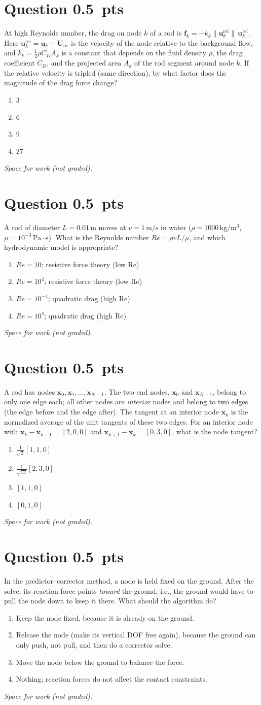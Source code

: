 \documentclass[letterpaper,11pt]{article}
\newcounter{qnum}
\newcommand{\qpts}{0.5}
\newcommand{\mcq}[5]{%
  \clearpage
  \stepcounter{qnum}%
  \section*{Question \theqnum \hfill \normalsize \qpts~pts}
  #1
  \begin{enumerate}[label=(\alph*)]
    \item #2
    \item #3
    \item #4
    \item #5
  \end{enumerate}
  \vspace{3mm}

  \textit{Space for work (not graded).}
}
\begin{document}
%
%
\mcq{At high Reynolds number, the drag on node $k$ of a rod is $\mathbf{f}_k = -k_k \|\mathbf{u}^{\text{rel}}_k\| \, \mathbf{u}^{\text{rel}}_k$. Here $\mathbf{u}^{\text{rel}}_k = \mathbf{u}_k - \mathbf{U}_\infty$ is the velocity of the node relative to the background flow, and $k_k = \frac{1}{2} \rho C_D A_k$ is a constant that depends on the fluid density $\rho$, the drag coefficient $C_D$, and the projected area $A_k$ of the rod segment around node $k$. If the relative velocity is tripled (same direction), by what factor does the magnitude of the drag force change?}
  {3}
  {6}
  {9}
  {27}

%
%
\mcq{A rod of diameter $L = 0.01\,\mathrm{m}$ moves at $v = 1\,\mathrm{m/s}$ in water ($\rho = 1000\,\mathrm{kg/m^3}$, $\mu = 10^{-3}\,\mathrm{Pa \cdot s}$). What is the Reynolds number $Re = \rho v L / \mu$, and which hydrodynamic model is appropriate?}
  {$Re = 10$; resistive force theory (low Re)}
  {$Re = 10^4$; resistive force theory (low Re)}
  {$Re = 10^{-4}$; quadratic drag (high Re)}
  {$Re = 10^4$; quadratic drag (high Re)}

%
%
\mcq{A rod has nodes $\mathbf{x}_0, \mathbf{x}_1, \ldots, \mathbf{x}_{N-1}$. The two end nodes, $\mathbf{x}_0$ and $\mathbf{x}_{N-1}$, belong to only one edge each; all other nodes are \emph{interior} nodes and belong to two edges (the edge before and the edge after). The tangent at an interior node $\mathbf{x}_k$ is the normalized average of the unit tangents of these two edges. For an interior node with $\mathbf{x}_k - \mathbf{x}_{k-1} = [2, 0, 0]$ and $\mathbf{x}_{k+1} - \mathbf{x}_k = [0, 3, 0]$, what is the node tangent?}
  {$\frac{1}{\sqrt{2}}[1, 1, 0]$}
  {$\frac{1}{\sqrt{13}}[2, 3, 0]$}
  {$[1, 1, 0]$}
  {$[0, 1, 0]$}

%
%
\mcq{In the predictor--corrector method, a node is held fixed on the ground. After the solve, its reaction force points \emph{toward} the ground, i.e., the ground would have to pull the node down to keep it there. What should the algorithm do?}
  {Keep the node fixed, because it is already on the ground.}
  {Release the node (make its vertical DOF free again), because the ground can only push, not pull, and then do a corrector solve.}
  {Move the node below the ground to balance the force.}
  {Nothing; reaction forces do not affect the contact constraints.}
\end{document}
